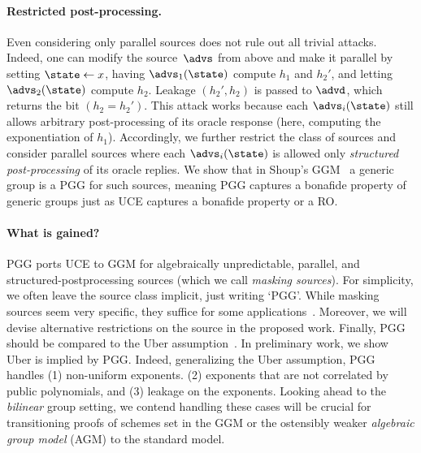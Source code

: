 {\begin{itemize}


\paragraph*{Restricted post-processing.}
Even considering only parallel sources does not rule out all trivial attacks. Indeed, one can modify the source~$\advs$ from above and make it parallel by setting $\state \gets x$, having $\advs_1(\state)$ compute $h_1$ and $h_2'$, and letting $\advs_2(\state)$ compute $h_2$. Leakage $(h_2', h_2)$ is passed to $\advd$, which returns the bit $(h_2 = h_2')$. This attack works because each $\advs_i(\state)$ still allows arbitrary post-processing of its oracle response (here, computing the exponentiation of $h_1$). Accordingly, we further restrict the class of sources and consider  parallel sources where each $\advs_i(\state)$ is allowed only \emph{structured post-processing} of its oracle replies.  
We show that in Shoup's GGM~\cite{EC:Shoup97} a generic group is a PGG for such sources, meaning PGG  captures a bonafide property of generic groups just as UCE captures a bonafide property or a RO.

\paragraph*{What is  gained?} 
PGG  ports UCE to GGM for algebraically unpredictable, parallel, and structured-postprocessing sources (which we call \emph{masking sources}). For simplicity, we often leave the source class implicit, just writing `PGG'. While masking sources seem very specific, they suffice for some applications~\cite{}.  Moreover, we will devise alternative restrictions on the source in the proposed work.
Finally, PGG  should be  compared to the Uber assumption~\cite{}.  In preliminary work, we show Uber is implied by PGG.  Indeed, generalizing  the Uber assumption, PGG   handles (1) non-uniform exponents. (2) exponents that are not correlated by public polynomials, and (3)  leakage on the exponents. Looking ahead to the \emph{bilinear} group setting, we contend handling these cases will be crucial for transitioning proofs of schemes set in the GGM or the ostensibly weaker \emph{algebraic group model} (AGM) to the standard model.  %
\fi



\end{itemize}}
